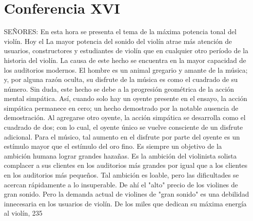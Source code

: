 \chapter*{Conferencia XVI}
SEÑORES: En esta hora se presenta el tema de la máxima potencia tonal del violín. Hoy el
La mayor potencia del sonido del violín atrae más atención de usuarios, constructores y estudiantes de violín que en cualquier otro período de la historia del violín. La causa de este hecho se encuentra en la mayor capacidad de los auditorios modernos. El hombre es un animal gregario y amante de la música; y, por alguna razón oculta, su disfrute de la música es como el cuadrado de su número. Sin duda, este hecho se debe a la progresión geométrica de la acción mental simpática. Así, cuando solo hay un oyente presente en el ensayo, la acción simpática permanece en cero; un hecho demostrado por la notable ausencia de demostración. Al agregarse otro oyente, la acción simpática se desarrolla como el cuadrado de dos; con lo cual, el oyente único se vuelve consciente de un disfrute adicional. Para el músico, tal aumento en el disfrute por parte del oyente es un estímulo mayor que el
estímulo del oro fino.
Es siempre un objetivo de la ambición humana lograr grandes hazañas. Es la ambición del violinista solista complacer a sus clientes en los auditorios más grandes por igual que a los clientes en los auditorios más pequeños. Tal ambición es loable, pero las dificultades se acercan rápidamente a lo insuperable. De ahí el "alto" precio de los violines de gran sonido. Pero la demanda actual de violines de "gran sonido" es una debilidad innecesaria en los usuarios de violín. De los miles que dedican su máxima energía al violín,
235

